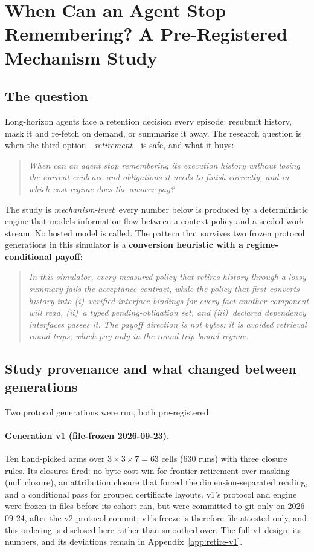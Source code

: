 



\section{When Can an Agent Stop Remembering? A Pre-Registered Mechanism Study}\label{sec:retire}

\subsection{The question}\label{sec:retire-question}
Long-horizon agents face a retention decision every episode: resubmit
history, mask it and re-fetch on demand, or summarize it away. The
research question is when the third option---\emph{retirement}---is
safe, and what it buys:
\begin{quote}
\emph{When can an agent stop remembering its execution history without
losing the current evidence and obligations it needs to finish
correctly, and in which cost regime does the answer pay?}
\end{quote}

The study is \emph{mechanism-level}: every number below is produced by
a deterministic engine that models information flow between a context
policy and a seeded work stream. No hosted model is called. The
pattern that survives two frozen protocol generations in this
simulator is a \textbf{conversion heuristic with a regime-conditional
payoff}:
\begin{quote}
\emph{In this simulator, every measured policy that retires history
through a lossy summary fails the acceptance contract, while the
policy that first converts history into (i)~verified interface
bindings for every fact another component will read, (ii)~a typed
pending-obligation set, and (iii)~declared dependency interfaces
passes it. The payoff direction is not bytes: it is avoided retrieval
round trips, which pay only in the round-trip-bound regime.}
\end{quote}

\subsection{Study provenance and what changed between generations}\label{sec:retire-provenance}
Two protocol generations were run, both pre-registered.
\paragraph{Generation v1 (file-frozen 2026-09-23).} Ten hand-picked
arms over $3\times3\times7=63$ cells (630 runs) with three closure
rules. Its closures fired: no byte-cost win for frontier retirement
over masking (null closure), an attribution closure that forced the
dimension-separated reading, and a conditional pass for grouped
certificate layouts. v1's protocol and engine were frozen in files
before its cohort ran, but were committed to git only on 2026-09-24,
after the v2 protocol commit; v1's freeze is therefore file-attested
only, and this ordering is disclosed here rather than smoothed over.
The full v1 design, its numbers, and its deviations remain in
Appendix~\ref{app:retire-v1}.

